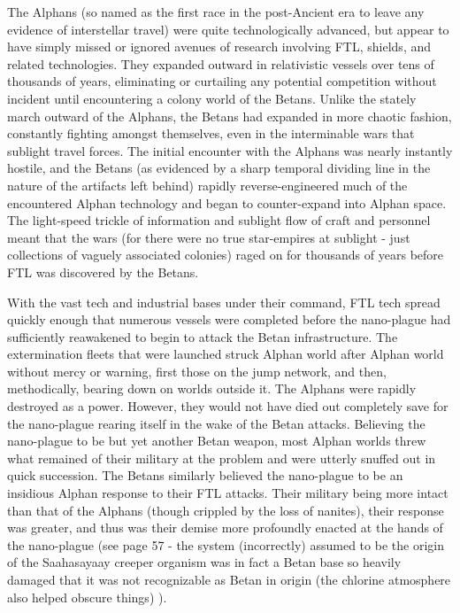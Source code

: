 The Alphans (so named as the first race in the post-Ancient era to
leave any evidence of interstellar travel) were quite technologically
advanced, but appear to have simply missed or ignored avenues of
research involving FTL, shields, and related technologies. They
expanded outward in relativistic vessels over tens of thousands of
years, eliminating or curtailing any potential competition without
incident until encountering a colony world of the Betans. Unlike the
stately march outward of the Alphans, the Betans had expanded in more
chaotic fashion, constantly fighting amongst themselves, even in the
interminable wars that sublight travel forces. The initial encounter
with the Alphans was nearly instantly hostile, and the Betans (as
evidenced by a sharp temporal dividing line in the nature of the
artifacts left behind) rapidly reverse-engineered much of the
encountered Alphan technology and began to counter-expand into Alphan
space. The light-speed trickle of information and sublight flow of
craft and personnel meant that the wars (for there were no true
star-empires at sublight - just collections of vaguely associated
colonies) raged on for thousands of years before FTL was discovered by
the Betans.

With the vast tech and industrial bases under their command, FTL tech
spread quickly enough that numerous vessels were completed before the
nano-plague had sufficiently reawakened to begin to attack the Betan
infrastructure. The extermination fleets that were launched struck
Alphan world after Alphan world without mercy or warning, first those
on the jump network, and then, methodically, bearing down on worlds
outside it. The Alphans were rapidly destroyed as a power. However,
they would not have died out completely save for the nano-plague
rearing itself in the wake of the Betan attacks. Believing the
nano-plague to be but yet another Betan weapon, most Alphan worlds
threw what remained of their military at the problem and were utterly
snuffed out in quick succession. The Betans similarly believed the
nano-plague to be an insidious Alphan response to their FTL
attacks. Their military being more intact than that of the Alphans
(though crippled by the loss of nanites), their response was greater,
and thus was their demise more profoundly enacted at the hands of the
nano-plague (see page 57 - the system (incorrectly) assumed to be the
origin of the Saahasayaay creeper organism was in fact a Betan base so
heavily damaged that it was not recognizable as Betan in origin (the
chlorine atmosphere also helped obscure things) ).

